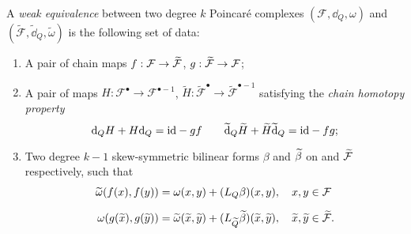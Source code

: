 \begin{definition}
\label{def:weak_eq_Poincaré}
    A \emph{weak equivalence} between two degree $k$ Poincaré complexes $(\mathcal{F}, \dd_Q, \omega)$ and $(\widetilde{\mathcal{F}}, \widetilde{\dd}_Q, \widetilde{\omega})$ is the following set of data:
    \begin{enumerate}[label=\roman*)]
        \item A pair of chain maps $f:\mathcal{F} \rightarrow \widetilde{\mathcal{F}}$, $g:\widetilde{\mathcal{F}} \rightarrow \mathcal{F}$;
        \item A pair of maps $H: \mathcal{F}^\bullet \rightarrow \mathcal{F}^{\bullet -1}$, $\widetilde{H}:\widetilde{\mathcal{F}}^\bullet \rightarrow \widetilde{\mathcal{F}}^{\bullet -1}$ satisfying the \emph{chain homotopy property}
        \begin{equation}
            \dd_Q H + H \dd_Q = \text{id} -gf \qquad \widetilde{\dd}_Q \widetilde{H} + \widetilde{H} \widetilde{\dd}_Q = \text{id} -fg ;
        \end{equation}
        \item Two degree $k-1$ skew-symmetric bilinear forms $\beta$ and $\widetilde{\beta}$ on \F and $\widetilde{\mathcal{F}}$ respectively, such that
        \begin{align*}
            \widetilde{\omega}(f(x), f(y)) =&
            \; \omega (x, y) +
            (L_Q \beta) (x, y),
            \quad x, y \in \mathcal{F} \\[6pt]
            \omega(g(\widetilde{x}), g(\widetilde{y})) =&
            \; \widetilde{\omega}(\widetilde{x}, \widetilde{y}) +
            (L_{\widetilde{Q}} \widetilde{\beta})(\widetilde{x}, \widetilde{y}),
            \quad \widetilde{x}, \widetilde{y} \in \widetilde{\mathcal{F}}.
        \end{align*}
    \end{enumerate}
\end{definition}

